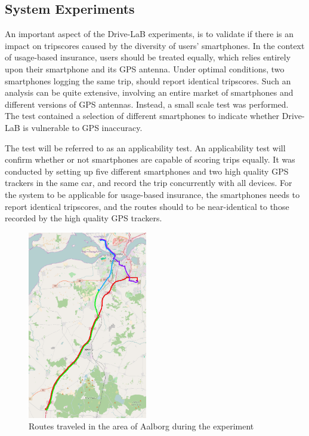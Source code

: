 \subsection{System Experiments}\label{subsec:expsystem}
An important aspect of the Drive-LaB experiments, is to validate if there is an impact on tripscores caused by the diversity of users' smartphones. In the context of usage-based insurance, users should be treated equally, which relies entirely upon their smartphone and its GPS antenna. Under optimal conditions, two smartphones logging the same trip, should report identical tripscores. Such an analysis can be quite extensive, involving an entire market of smartphones and different versions of GPS antennas. Instead, a small scale test was performed. The test contained a selection of different smartphones to indicate whether Drive-LaB is vulnerable to GPS inaccuracy. 

The test will be referred to as an applicability test. An applicability test will confirm whether or not smartphones are capable of scoring trips equally. It was conducted by setting up five different smartphones and two high quality GPS trackers \citep{quality_gps_device} in the same car, and record the trip concurrently with all devices. For the system to be applicable for usage-based insurance, the smartphones needs to report identical tripscores, and the routes should to be near-identical to those recorded by the high quality GPS trackers.
 
\begin{figure}[tb]
\centering
\includegraphics[width=0.465\textwidth]{Pictures/experiment_routes}
\caption{Routes traveled in the area of Aalborg during the experiment}
\label{fig:experiment_routes}
\end{figure}

